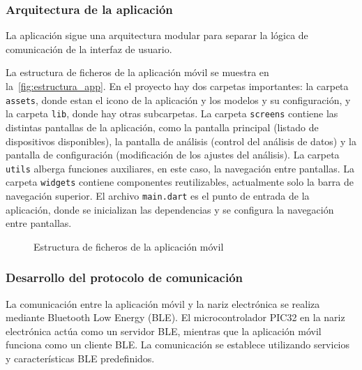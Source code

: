 \subsubsection{Arquitectura de la aplicación}
La aplicación sigue una arquitectura modular para separar la lógica de comunicación de la interfaz de usuario.
\par

La estructura de ficheros de la aplicación móvil se muestra en la~\autoref{fig:estructura_app}. En el proyecto hay dos carpetas importantes: la carpeta \texttt{assets}, donde estan el icono de la aplicación y los modelos y su configuración, y la carpeta \texttt{lib}, donde hay otras subcarpetas. La carpeta \texttt{screens} contiene las distintas pantallas de la aplicación, como la pantalla principal (listado de dispositivos disponibles), la pantalla de análisis (control del análisis de datos) y la pantalla de configuración (modificación de los ajustes del análisis). La carpeta \texttt{utils} alberga funciones auxiliares, en este caso, la navegación entre pantallas. La carpeta \texttt{widgets} contiene componentes reutilizables, actualmente solo la barra de navegación superior. El archivo \texttt{main.dart} es el punto de entrada de la aplicación, donde se inicializan las dependencias y se configura la navegación entre pantallas.

\begin{figure}[H]
    \centering
    \caption{Estructura de ficheros de la aplicación móvil}\label{fig:estructura_app}
\end{figure}

\subsubsection{Desarrollo del protocolo de comunicación}
La comunicación entre la aplicación móvil y la nariz electrónica se realiza mediante Bluetooth Low Energy (BLE). El microcontrolador PIC32 en la nariz electrónica actúa como un servidor BLE, mientras que la aplicación móvil funciona como un cliente BLE\@. La comunicación se establece utilizando servicios y características BLE predefinidos.

